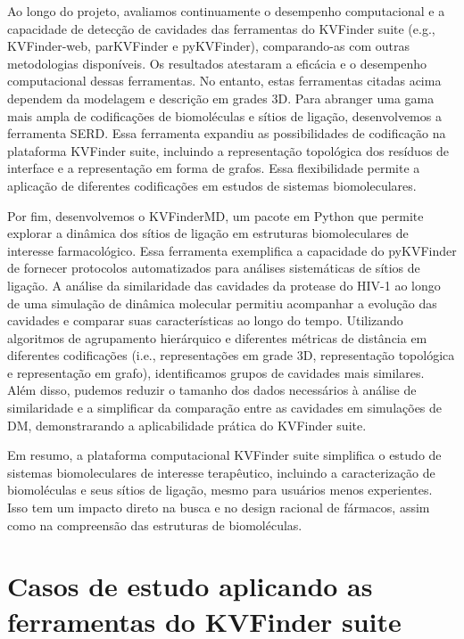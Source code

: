 \documentclass[Portugues]{phdquali}
\def\ie{i.e.\onedot}
\def\eg{e.g.\onedot}
\begin{document}
Ao longo do projeto, avaliamos continuamente o desempenho computacional e a capacidade de detecção de cavidades das ferramentas do KVFinder suite (\eg, KVFinder-web, parKVFinder e pyKVFinder), comparando-as com outras metodologias disponíveis. Os resultados atestaram a eficácia e o desempenho computacional dessas ferramentas. No entanto, estas ferramentas citadas acima dependem da modelagem e descrição em grades 3D. Para abranger uma gama mais ampla de codificações de biomoléculas e sítios de ligação, desenvolvemos a ferramenta SERD. Essa ferramenta expandiu as possibilidades de codificação na plataforma KVFinder suite, incluindo a representação topológica dos resíduos de interface e a representação em forma de grafos. Essa flexibilidade permite a aplicação de diferentes codificações em estudos de sistemas biomoleculares.

Por fim, desenvolvemos o KVFinderMD, um pacote em Python que permite explorar a dinâmica dos sítios de ligação em estruturas biomoleculares de interesse farmacológico. Essa ferramenta exemplifica a capacidade do pyKVFinder de fornecer protocolos automatizados para análises sistemáticas de sítios de ligação. A análise da similaridade das cavidades da protease do HIV-1 ao longo de uma simulação de dinâmica molecular permitiu acompanhar a evolução das cavidades e comparar suas características ao longo do tempo. Utilizando algoritmos de agrupamento hierárquico e diferentes métricas de distância em diferentes codificações (\ie, representações em grade 3D, representação topológica e representação em grafo), identificamos grupos de cavidades mais similares. Além disso, pudemos reduzir o tamanho dos dados necessários à análise de similaridade e a simplificar da comparação entre as cavidades em simulações de DM, demonstrarando a aplicabilidade prática do KVFinder suite.

Em resumo, a plataforma computacional KVFinder suite simplifica o estudo de sistemas biomoleculares de interesse terapêutico, incluindo a caracterização de biomoléculas e seus sítios de ligação, mesmo para usuários menos experientes. Isso tem um impacto direto na busca e no design racional de fármacos, assim como na compreensão das estruturas de biomoléculas.




\appendix

\chapter{Casos de estudo aplicando as ferramentas do KVFinder suite \label{ap:casos-de-estudo}}
\end{document}
